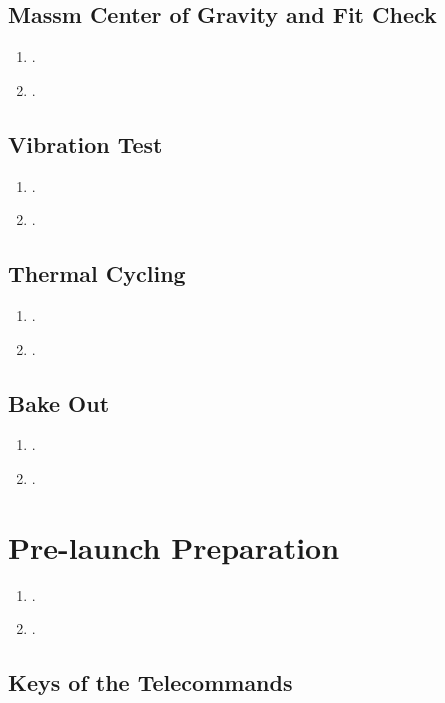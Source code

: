 \subsection{Massm Center of Gravity and Fit Check}

\begin{enumerate}
    \item .
    \item .
\end{enumerate}

\subsection{Vibration Test}

\begin{enumerate}
    \item .
    \item .
\end{enumerate}

\subsection{Thermal Cycling}

\begin{enumerate}
    \item .
    \item .
\end{enumerate}

\subsection{Bake Out}

\begin{enumerate}
    \item .
    \item .
\end{enumerate}

\section{Pre-launch Preparation}

\begin{enumerate}
    \item .
    \item .
\end{enumerate}

\subsection{Keys of the Telecommands}

